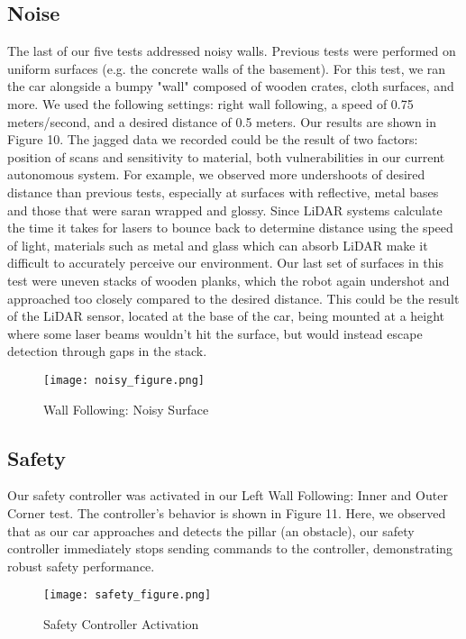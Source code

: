 \documentclass{article}
\begin{document}
\subsection{Noise}
The last of our five tests addressed noisy walls. Previous tests were performed on uniform surfaces (e.g. the concrete walls of the basement). For this test, we ran the car alongside a bumpy "wall" composed of wooden crates, cloth surfaces, and more. We used the following settings: right wall following, a speed of 0.75 meters/second, and a desired distance of 0.5 meters. Our results are shown in Figure 10. The jagged data we recorded could be the result of two factors: position of scans and sensitivity to material, both vulnerabilities in our current autonomous system. For example, we observed more undershoots of desired distance than previous tests, especially at surfaces with reflective, metal bases and those that were saran wrapped and glossy. Since LiDAR systems calculate the time it takes for lasers to bounce back to determine distance using the speed of light, materials such as metal and glass which can absorb LiDAR make it difficult to accurately perceive our environment. Our last set of surfaces in this test were  uneven stacks of wooden planks, which the robot again undershot and approached too closely compared to the desired distance. This could be the result of the LiDAR sensor, located at the base of the car, being mounted at a height where some laser beams wouldn't hit the surface, but would instead escape detection through gaps in the stack.

\begin{figure}[H]
\begin{center}
\texttt{[image: noisy\_figure.png]} %
\caption{Wall Following: Noisy Surface}
\end{center}
\label{workflow}
\end{figure}

\subsection{Safety}
Our safety controller was activated in our Left Wall Following: Inner and Outer Corner test. The controller's behavior is shown in Figure 11. Here, we observed that as our car approaches and detects the pillar (an obstacle), our safety controller immediately stops sending commands to the controller, demonstrating robust safety performance.

\begin{figure}[H]
\begin{center}
\texttt{[image: safety\_figure.png]} %
\caption{Safety Controller Activation}
\end{center}
\label{workflow}
\end{figure}
\end{document}
